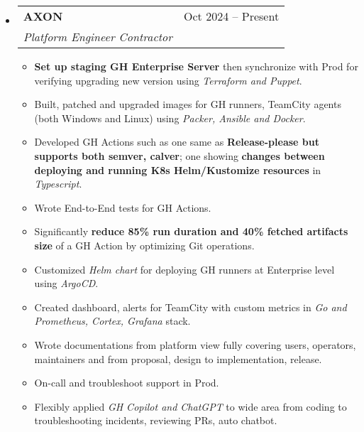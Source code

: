 \documentclass[letterpaper,12pt]{article}[leftmargin=*]
\makeatletter
\def \entryspacing {5pt}
\newcommand{\resumeEntryStart}{\begin{itemize}[leftmargin=2.5mm]}
\newcommand{\resumeEntryEnd}{\end{itemize}\vspace{\entryspacing}}
\newcommand{\resumeItemListStart}{\begin{itemize}[leftmargin=4.5mm]}
\newcommand{\resumeItemListEnd}{\end{itemize}}
\newcommand{\resumeItem}[1]{
  \item\small{
    {#1 \vspace{-2pt}}
  }
}
\newcommand{\resumeEntryTSDL}[4]{
  \vspace{-1pt}\item[]
    \begin{tabularx}{0.97\textwidth}{X@{\hspace{60pt}}r}
      \textbf{\color{primary}#1} & {\firabook\color{accent}\small#2} \\
      \textit{\color{accent}\small#3} & {\firabook\color{accent}\small#4} \\
    \end{tabularx}\vspace{-6pt}
}
\makeatother
\begin{document}
  \resumeEntryStart
    \resumeEntryTSDL
      {AXON}{Oct 2024 -- Present}
      {Platform Engineer Contractor}{}
    \resumeItemListStart
      \resumeItem {\textbf{Set up staging GH Enterprise Server} then synchronize with Prod for verifying upgrading new version using \textit{Terraform and Puppet}.}
      \resumeItem {Built, patched and upgraded images for GH runners, TeamCity agents (both Windows and Linux) using \textit{Packer, Ansible and Docker}.}
      \resumeItem {Developed GH Actions such as one same as \textbf{Release-please but supports both semver, calver}; one showing \textbf{changes between deploying and running K8s Helm/Kustomize resources} in \textit{Typescript}.}
      \resumeItem {Wrote End-to-End tests for GH Actions.}
      \resumeItem {Significantly \textbf{reduce 85\% run duration and 40\% fetched artifacts size} of a GH Action by optimizing Git operations.}
      \resumeItem {Customized \textit{Helm chart} for deploying GH runners at Enterprise level using \textit{ArgoCD}.}
      \resumeItem {Created dashboard, alerts for TeamCity with custom metrics in \textit{Go and Prometheus, Cortex, Grafana} stack.}
      \resumeItem {Wrote documentations from platform view fully covering users, operators, maintainers and from proposal, design to implementation, release.}
      \resumeItem {On-call and troubleshoot support in Prod.}
      \resumeItem {Flexibly applied \textit{GH Copilot and ChatGPT} to wide area from coding to troubleshooting incidents, reviewing PRs, auto chatbot.}
    \resumeItemListEnd
  \resumeEntryEnd
\end{document}
